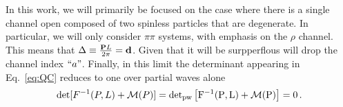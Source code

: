 In this work, we will primarily be focused on the case where there is a single channel open composed of two spinless particles that are degenerate. In particular, we will only consider $\pi\pi$ systems, with emphasis on the $\rho$ channel. This means that $\Delta \equiv \frac{\textbf P L}{2 \pi} =\textbf{d}$. Given that it will be surpperflous will drop the channel index $``a"$. Finally, in this limit the determinant appearing in Eq.~\ref{eq:QC} reduces to one over partial waves alone
\begin{align}
\det[F^{-1}(P,L) + \mathcal M(P)]=
\rm{det}_{\rm{pw}}\left[F^{-1}(P,L) + \mathcal M(P)\right]=0 \,.
\label{eq:QC_onech}
\end{align}


%
%

